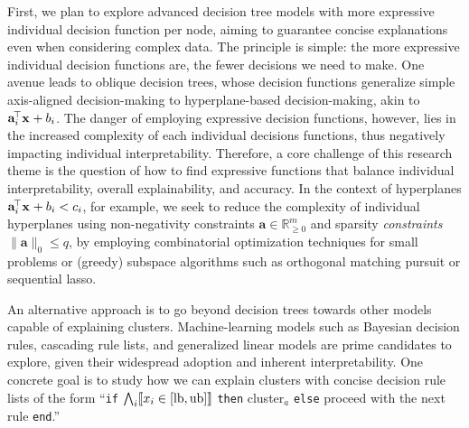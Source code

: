 \documentclass[a4paper,11pt]{article}
\begin{document}
First, we plan to explore advanced decision tree models with more expressive individual decision function per node, aiming to guarantee concise explanations even when considering complex data.
The principle is simple: the more expressive individual decision functions are, the fewer decisions we need to make. 
One avenue leads to oblique decision trees, whose decision functions generalize simple axis-aligned decision-making to hyperplane-based decision-making, akin to $\mathbf{a}_i^{\!\top} \mathbf{x}^{\vphantom{\top}}_{\vphantom{i}} + b_i$. %
The danger of employing expressive decision functions, however, lies in the increased complexity of each individual decisions functions, thus negatively impacting individual interpretability.
Therefore, a core challenge of this research theme is the question of how to find expressive functions that balance individual interpretability, overall explainability, and accuracy.
In the context of hyper\-planes $\mathbf{a}_i^{\!\top} \mathbf{x}^{\vphantom{\top}}_{\vphantom{i}} + b_i < c_i$, for example, we seek to reduce the complexity of individual hyper\-planes using non-negativity constraints $\mathbf{a} \in \mathbb{R}^m_{\geq 0}$ and sparsity \emph{constraints} $\|\mathbf{a}\|_0 \leq q$, by employing combinatorial optimization techniques for small problems or (greedy) subspace algorithms such as orthogonal matching pursuit or sequential lasso.

An alternative approach is to go beyond decision trees towards other models capable of explaining clusters. 
Machine-learning models such as Bayesian decision rules, cascading rule lists, and generalized linear models 
are prime candidates to explore, given their widespread adoption and inherent interpretability. 
One concrete goal is to study how we can explain clusters with concise decision rule lists 
of the form ``\texttt{if} $\bigwedge_i \llbracket x_i \in [\textnormal{lb}, \textnormal{ub}] \rrbracket$ 
\texttt{then} cluster$_a$ \texttt{else} proceed with the next rule \texttt{end}.'' 
\end{document}
